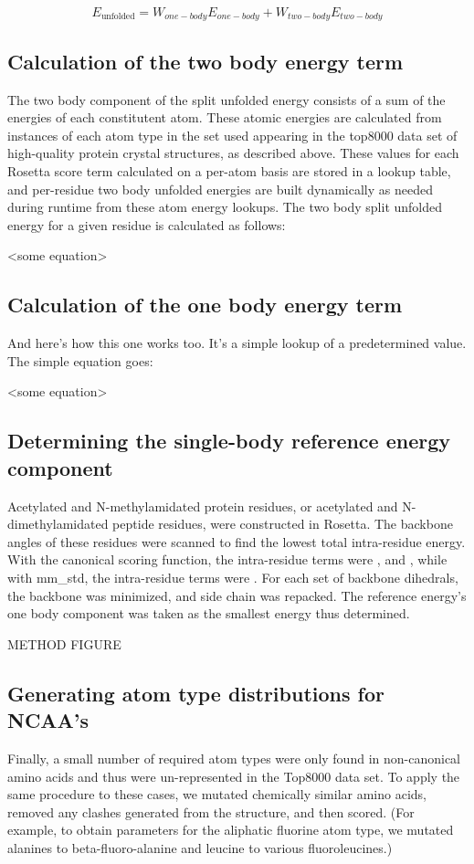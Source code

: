 \begin{equation}
E_{\text{unfolded}} =  W_{one-body} E_{one-body} +  W_{two-body} E_{two-body}
\end{equation}

\subsection{Calculation of the two body energy term}
The two body component of the split unfolded energy consists of a sum of the energies of each constitutent atom. These atomic energies are calculated from instances of each atom type in the set used appearing in the top8000 data set of high-quality protein crystal structures, as described above. These values for each Rosetta score term calculated on a per-atom basis are stored in a lookup table, and per-residue two body unfolded energies are built dynamically as needed during runtime from these atom energy lookups. The two body split unfolded energy for a given residue is calculated as follows:

<some equation>
\subsection{Calculation of the one body energy term}
And here's how this one works too. It's a simple lookup of a predetermined value. The simple equation goes:

<some equation>
\subsection{Determining the single-body reference energy component}
Acetylated and N-methylamidated protein residues, or acetylated and N-dimethylamidated peptide residues, were constructed in Rosetta. The backbone angles of these residues were scanned to find the lowest total intra-residue energy. With the canonical scoring function, the intra-residue terms were , and , while with mm\_std, the intra-residue terms were . For each set of backbone dihedrals, the backbone was minimized, and side chain was repacked. The reference energy's one body component was taken as the smallest energy thus determined.

METHOD FIGURE

\subsection{Generating atom type distributions for NCAA's} 
Finally, a small number of required atom types were only found in non-canonical amino acids and thus were un-represented in the Top8000 data set. To apply the same procedure to these cases, we mutated chemically similar amino acids, removed any clashes generated from the structure, and then scored. (For example, to obtain parameters for the aliphatic fluorine atom type, we mutated alanines to beta-fluoro-alanine and leucine to various fluoroleucines.)


